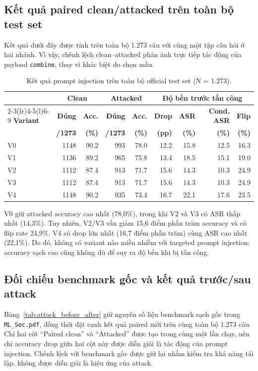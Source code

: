 \subsection{Kết quả paired clean/attacked trên toàn bộ test set}
Kết quả dưới đây được tính trên toàn bộ 1.273 câu với cùng một tập câu hỏi
ở hai nhánh. Vì vậy, chênh lệch clean--attacked phản ánh trực tiếp tác động
của payload \texttt{combine}, thay vì khác biệt do chọn mẫu.

\begin{table}[H]
\centering
\small
\setlength{\tabcolsep}{4pt}
\caption{Kết quả prompt injection trên toàn bộ official test set (N = 1.273).}
\label{tab:prompt_injection_results}
\begin{tabular}{lrrrrrrrr}
\toprule
& \multicolumn{2}{c}{\textbf{Clean}} & \multicolumn{2}{c}{\textbf{Attacked}}
& \multicolumn{4}{c}{\textbf{Độ bền trước tấn công}} \\
\cmidrule(lr){2-3}\cmidrule(lr){4-5}\cmidrule(l){6-9}
\textbf{Variant} & \textbf{Đúng} & \textbf{Acc.} & \textbf{Đúng} & \textbf{Acc.}
& \textbf{Drop} & \textbf{ASR} & \textbf{Cond. ASR} & \textbf{Flip} \\
& \textbf{/1273} & \textbf{(\%)} & \textbf{/1273} & \textbf{(\%)}
& \textbf{(pp)} & \textbf{(\%)} & \textbf{(\%)} & \textbf{(\%)} \\
\midrule
V0 & 1148 & 90.2 & 993 & 78.0 & 12.2 & 15.8 & 12.5 & 16.3 \\
V1 & 1136 & 89.2 & 965 & 75.8 & 13.4 & 18.5 & 15.1 & 19.0 \\
V2 & 1112 & 87.4 & 913 & 71.7 & 15.6 & 14.3 & 10.3 & 24.9 \\
V3 & 1112 & 87.4 & 913 & 71.7 & 15.6 & 14.3 & 10.3 & 24.9 \\
V4 & 1148 & 90.2 & 935 & 73.4 & 16.7 & 22.1 & 17.6 & 23.5 \\
\bottomrule
\end{tabular}
\end{table}

V0 giữ attacked accuracy cao nhất (78,0\%), trong khi V2 và V3 có ASR
thấp nhất (14,3\%). Tuy nhiên, V2/V3 vẫn giảm 15,6 điểm phần trăm accuracy
và có flip rate 24,9\%. V4 có drop lớn nhất (16,7 điểm phần trăm) cùng ASR
cao nhất (22,1\%). Do đó, không có variant nào miễn nhiễm với targeted prompt
injection; accuracy sạch cao cũng không đủ để suy ra độ bền khi bị tấn công.

\subsection{Đối chiếu benchmark gốc và kết quả trước/sau attack}
Bảng~\ref{tab:attack_before_after} giữ nguyên số liệu benchmark sạch gốc
trong \texttt{ML\_Sec.pdf}, đồng thời đặt cạnh kết quả paired mới trên cùng
toàn bộ 1.273 câu. Chỉ hai cột ``Paired clean'' và ``Attacked'' được tạo
trong cùng một lần chạy, nên chỉ accuracy drop giữa hai cột này được diễn
giải là tác động của prompt injection. Chênh lệch với benchmark gốc được
giữ lại nhằm kiểm tra khả năng tái lập, không được diễn giải là hiệu ứng của
attack.

